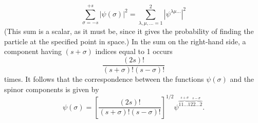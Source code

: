 \begin{equation}
 \sum_{\sigma=-s}^{+s}|\psi(\sigma)|^2
 =\sum_{\lambda,\mu,\ldots=1}^{2}|\psi^{\lambda\mu\ldots}|^2
 \tag{57.1}
\end{equation}
(This sum is a scalar, as it must be, since it gives the probability of finding
the particle at the specified point in space.) In the sum on the right-hand
side, a component having $(s+\sigma)$ indices equal to 1 occurs
\[
 \frac{(2s)!}{(s+\sigma)!(s-\sigma)!}
\]
times. It follows that the correspondence between the functions $\psi(\sigma)$
and the spinor components is given by
\begin{equation}
 \psi(\sigma)=\left[\frac{(2s)!}{(s+\sigma)!(s-\sigma)!}\right]^{1/2}
 \psi^{\overbrace{11\ldots1}^{s+\sigma}
       \overbrace{22\ldots2}^{s-\sigma}}.
 \tag{57.2}
\end{equation}

